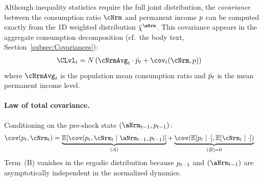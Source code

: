 \documentclass[\econtexRoot/BufferStockTheory]{subfiles}
\begin{document}
Although inequality statistics require the full joint distribution, the \textit{covariance} between the consumption ratio $\cNrm$ and permanent income $p$ can be computed exactly from the 1D weighted distribution $\mpPrbMargWgt$. This covariance appears in the aggregate consumption decomposition (cf.\ the body text, Section~\ref{subsec:Covariances}):
\begin{equation}\begin{gathered}\begin{aligned} \label{eq:CdecompApndx}
  \CLvl_{t} & = N\left(\cNrmAvg_{t} \cdot \bar{\permLvlPrb}_{t} + \cov_{t}(\cNrm, \permLvlPrb)\right)
\end{aligned}\end{gathered}\end{equation}
where $\cNrmAvg_{t}$ is the population mean consumption ratio and $\bar{p}_{t}$ is the mean permanent income level.

\paragraph{Law of total covariance.}
Conditioning on the pre-shock state $(\aNrm_{t-1}, \permLvlPrb_{t-1})$:
\begin{equation}\begin{gathered}\begin{aligned} \label{eq:LTC}
\cov(\permLvlPrb_{t}, \cNrm_{t}) & = \underbrace{\mathbb{E}\!\left[\cov(\permLvlPrb_{t}, \cNrm_{t} \mid \aNrm_{t-1}, \permLvlPrb_{t-1})\right]}_{(A)} + \underbrace{\cov\!\left(\mathbb{E}[\permLvlPrb_{t} \mid \cdot], \mathbb{E}[\cNrm_{t} \mid \cdot]\right)}_{(B) = 0}
\end{aligned}\end{gathered}\end{equation}
Term~(B) vanishes in the ergodic distribution because $p_{t-1}$ and $(\aNrm_{t-1})$ are asymptotically independent in the normalized dynamics.
\end{document}
